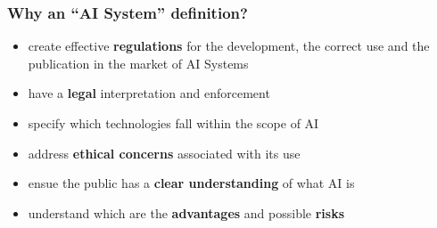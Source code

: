 \documentclass{beamer}
\begin{document}

\begin{frame}
\frametitle{Why an “AI System” definition?}
\begin{itemize}
\item create effective \textbf{regulations} for the development, the correct use and the publication in the market of AI Systems
\item have a \textbf{legal} interpretation and enforcement
\item specify which technologies fall within the scope of AI
\item address \textbf{ethical concerns} associated with its use
\item ensue the public has a \textbf{clear understanding} of what AI is
\item understand which are the \textbf{advantages} and possible \textbf{risks}
\end{itemize}
\end{frame}





\end{document}
